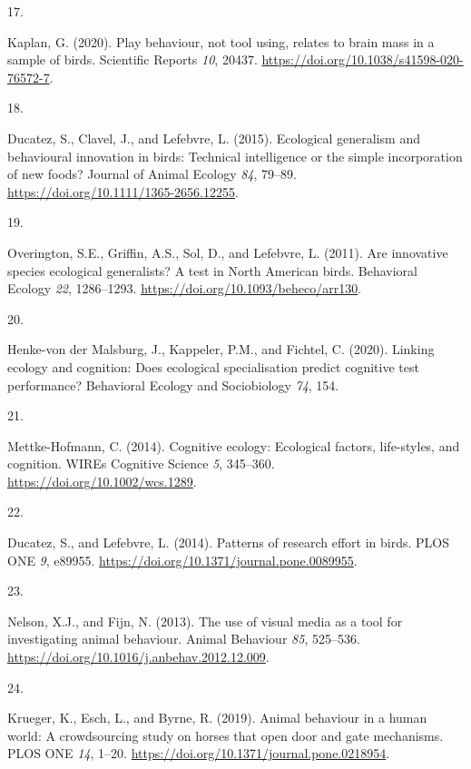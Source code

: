 \documentclass[
  man, donotrepeattitle,floatsintext]{apa6}
\newlength{\cslhangindent}
\newlength{\csllabelwidth}
\newlength{\cslentryspacingunit} %
\newenvironment{CSLReferences}[2] %
 {%
  \setlength{\parindent}{0pt}
  \ifodd #1
  \let\oldpar\par
  \def\par{\hangindent=\cslhangindent\oldpar}
  \fi
  \setlength{\parskip}{#2\cslentryspacingunit}
 }%
 {}
\newcommand{\CSLLeftMargin}[1]{\parbox[t]{\csllabelwidth}{#1}}
\newcommand{\CSLRightInline}[1]{\parbox[t]{\linewidth - \csllabelwidth}{#1}\break}
\begin{document}
\begin{CSLReferences}{0}{0}
\leavevmode{}%
\CSLLeftMargin{17. }%
\CSLRightInline{Kaplan, G. (2020). Play behaviour, not tool using, relates to brain mass in a sample of birds. Scientific Reports \emph{10}, 20437. \url{https://doi.org/10.1038/s41598-020-76572-7}.}

\leavevmode{}%
\CSLLeftMargin{18. }%
\CSLRightInline{Ducatez, S., Clavel, J., and Lefebvre, L. (2015). Ecological generalism and behavioural innovation in birds: Technical intelligence or the simple incorporation of new foods? Journal of Animal Ecology \emph{84}, 79--89. \url{https://doi.org/10.1111/1365-2656.12255}.}

\leavevmode{}%
\CSLLeftMargin{19. }%
\CSLRightInline{Overington, S.E., Griffin, A.S., Sol, D., and Lefebvre, L. (2011). Are innovative species ecological generalists? A test in {N}orth {A}merican birds. Behavioral Ecology \emph{22}, 1286--1293. \url{https://doi.org/10.1093/beheco/arr130}.}

\leavevmode{}%
\CSLLeftMargin{20. }%
\CSLRightInline{Henke-von der Malsburg, J., Kappeler, P.M., and Fichtel, C. (2020). Linking ecology and cognition: Does ecological specialisation predict cognitive test performance? Behavioral Ecology and Sociobiology \emph{74}, 154.}

\leavevmode{}%
\CSLLeftMargin{21. }%
\CSLRightInline{Mettke-Hofmann, C. (2014). Cognitive ecology: Ecological factors, life-styles, and cognition. WIREs Cognitive Science \emph{5}, 345--360. \url{https://doi.org/10.1002/wcs.1289}.}

\leavevmode{}%
\CSLLeftMargin{22. }%
\CSLRightInline{Ducatez, S., and Lefebvre, L. (2014). Patterns of research effort in birds. PLOS ONE \emph{9}, e89955. \url{https://doi.org/10.1371/journal.pone.0089955}.}

\leavevmode{}%
\CSLLeftMargin{23. }%
\CSLRightInline{Nelson, X.J., and Fijn, N. (2013). The use of visual media as a tool for investigating animal behaviour. Animal Behaviour \emph{85}, 525--536. \url{https://doi.org/10.1016/j.anbehav.2012.12.009}.}

\leavevmode{}%
\CSLLeftMargin{24. }%
\CSLRightInline{Krueger, K., Esch, L., and Byrne, R. (2019). Animal behaviour in a human world: A crowdsourcing study on horses that open door and gate mechanisms. PLOS ONE \emph{14}, 1--20. \url{https://doi.org/10.1371/journal.pone.0218954}.}


\end{CSLReferences}
\end{document}
